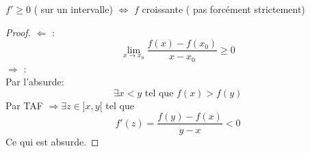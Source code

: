 \documentclass[../main.tex]{subfiles}
\begin{document}
\begin{crly}
	$f'\geq 0$ ( sur un intervalle) $\iff$ $f$ croissante ( pas forcément strictement) 
\end{crly}
\begin{proof}
$\Leftarrow$ :\\
\[ 
	\lim_{x \to x_0} \frac{f( x) -f( x_0) }{x-x_0} \geq 0
\]
$\Rightarrow$ :\\
Par l'absurde:
\[ 
	\exists x < y \text{ tel que } f( x) > f( y) 
\]
Par TAF $\Rightarrow \exists z \in ]x,y[$ tel que
\[ 
	f'( z) = \frac{f( y) - f( x) }{y-x} < 0
\]
Ce qui est absurde.


\end{proof}





























	
\end{document}
